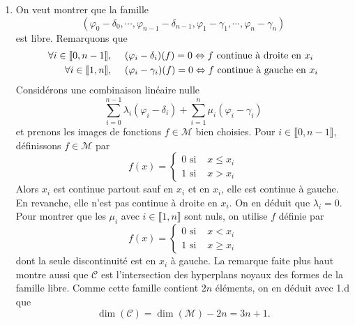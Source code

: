 \begin{enumerate}
  \item On veut montrer que la famille 
\begin{displaymath}
  \left(\varphi_0 - \delta_0, \cdots, \varphi_{n-1} - \delta_{n-1},\varphi_1 - \gamma_1, \cdots , \varphi_n - \gamma_n\right)  
\end{displaymath}
est libre. Remarquons que
\begin{align*}
\forall i \in \llbracket 0,n-1 \rrbracket,\hspace{0.5cm}&  (\varphi_i - \delta_i)(f) = 0 \Leftrightarrow f \text{ continue à droite en } x_i\\
\forall i \in \llbracket 1,n \rrbracket,\hspace{0.5cm}&  (\varphi_i - \gamma_i)(f) = 0 \Leftrightarrow f \text{ continue à gauche en } x_i
\end{align*}
Considérons une combinaison linéaire nulle
\begin{displaymath}
  \sum_{i=0}^{n-1}\lambda_i(\varphi_i - \delta_i) + \sum_{i=1}^{n}\mu_i(\varphi_i - \gamma_i)
\end{displaymath}
et prenons les images de fonctions $f\in \mathcal{M}$ bien choisies.\newline
Pour $i \in \llbracket 0, n-1\rrbracket$, définissons $f \in \mathcal{M}$ par 
\begin{displaymath}
  f(x)=
\left\lbrace 
\begin{aligned}
  0 \text{ si }& x\leq x_i \\ 1 \text{ si }& x > x_i
\end{aligned}
\right. 
\end{displaymath}
Alors $x_i$ est continue partout sauf en $x_i$ et en $x_i$, elle est continue à gauche. En revanche, elle n'est pas continue à droite en $x_i$. On en déduit que $\lambda_i = 0$.\newline
Pour montrer que les $\mu_i$ avec $i \in \llbracket 1, n\rrbracket$ sont nuls, on utilise $f$ définie par 
\begin{displaymath}
  f(x)=
\left\lbrace 
\begin{aligned}
  0 \text{ si }& x < x_i \\ 1 \text{ si }& x \geq x_i
\end{aligned}
\right. 
\end{displaymath}
dont la seule discontinuité est en $x_i$ à gauche.
La remarque faite plus haut montre aussi que  $\mathcal{C}$ est l'intersection des hyperplans noyaux des formes de la famille libre. Comme cette famille contient $2n$ éléments, on en déduit avec 1.d que
\begin{displaymath}
  \dim(\mathcal{C}) = \dim(\mathcal{M}) - 2n = 3n +1.
\end{displaymath}


\end{enumerate}
